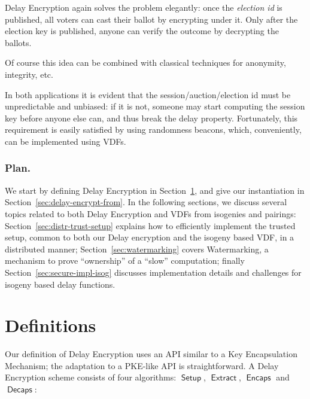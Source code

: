 \documentclass{llncs}
\DeclareMathOperator{\Setup}{\mathsf{Setup}}
\DeclareMathOperator{\Extract}{\mathsf{Extract}}
\DeclareMathOperator{\Encaps}{\mathsf{Encaps}}
\DeclareMathOperator{\Decaps}{\mathsf{Decaps}}
\begin{document}
Delay Encryption again solves the problem elegantly: once the
\emph{election id} is published, all voters can cast their ballot by
encrypting under it. %
Only after the election key is published, anyone can verify the
outcome by decrypting the ballots. %

Of course this idea can be combined with classical techniques for
anonymity, integrity, etc.

\medskip

In both applications it is evident that the session/auction/election
id must be unpredictable and unbiased: if it is not, someone may start
computing the session key before anyone else can, and thus break the
delay property. %
Fortunately, this requirement is easily satisfied by using randomness
beacons, which, conveniently, can be implemented using VDFs.

\subsubsection{Plan.}
We start by defining Delay Encryption in
Section~\ref{sec:definitions}, and give our instantiation in
Section~\ref{sec:delay-encrypt-from}. %
In the following sections, we discuss several topics related to both
Delay Encryption and VDFs from isogenies and pairings:
Section~\ref{sec:distr-trust-setup} explains how to efficiently
implement the trusted setup, common to both our Delay encryption and
the isogeny based VDF, in a distributed manner;
Section~\ref{sec:watermarking} covers Watermarking, a mechanism to
prove ``ownership'' of a ``slow'' computation; finally
Section~\ref{sec:secure-impl-isog} discusses implementation details
and challenges for isogeny based delay functions.


\section{Definitions}
\label{sec:definitions}

Our definition of Delay Encryption uses an API similar to a Key
Encapsulation Mechanism; the adaptation to a PKE-like API is
straightforward. A Delay Encryption scheme consists of four
algorithms: $\Setup$, $\Extract$, $\Encaps$ and $\Decaps$:
\end{document}

